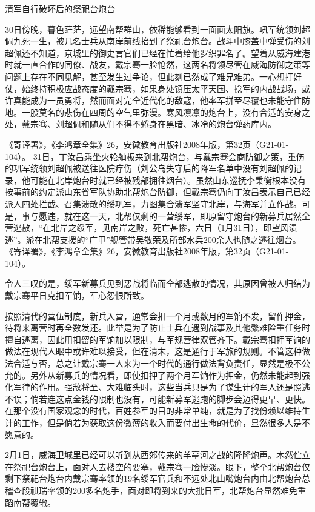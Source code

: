 \documentclass[12pt,UTF8]{ctexbook}
\begin{document}
清军自行破坏后的祭祀台炮台

30日傍晚，暮色茫茫，远望南帮群山，依稀能够看到一面面太阳旗。巩军统领刘超佩九死一生，被几名士兵从南岸前线抬到了祭祀台炮台。战斗中膝盖中弹受伤的刘超佩还不知道，京城里的御史言官们已经在忙着给他罗织罪名了。望着从威海建港时就一直合作的同僚、战友，戴宗骞一脸怆然，这两名将领尽管在威海防御之策等问题上存在不同见解，甚至发生过争论，但此刻已然成了难兄难弟。一心想打好仗，始终持积极应战态度的戴宗骞，如果身处镇压太平天国、捻军的内战战场，或许真能成为一员勇将，然而面对完全近代化的敌寇，他率军拼至尽覆也未能守住防地。一股莫名的悲伤在四周的空气里弥漫。寒风凛凛的炮台上，没有合适的安身之处，戴宗骞、刘超佩和随从们不得不蜷身在黑暗、冰冷的炮台弹药库内。

《寄译署》，《李鸿章全集》26，安徽教育出版社2008年版，第32页（G21-01-104）。
31日，丁汝昌乘坐火轮舢板来到北帮炮台，与戴宗骞会商防御之策，重伤的巩军统领刘超佩被送往医院疗伤（刘公岛失守后的降军名单中没有刘超佩的记录，他可能在北岸炮台时就已经被残部拥往烟台）。虽然山东巡抚李秉衡根本没有按事前的约定派山东省军队协助北帮炮台防御，但戴宗骞仍向丁汝昌表示自己已经派人四处拦截、召集溃散的绥巩军，力图集合溃军坚守北岸，与海军并立作战。可是，事与愿违，就在这一天，北帮仅剩的一营绥军，即原留守炮台的新募兵居然全营逃散，“在北岸之绥军，见南岸之败，死亡甚惨，六日（1月31日），即望风溃逃”。派在北帮支援的“广甲”舰管带吴敬荣及所部水兵200余人也随之逃往烟台。 《寄译署》，《李鸿章全集》26，安徽教育出版社2008年版，第32页（G21-01-104）。

令人三叹的是，绥军新募兵见到恶战将临而全部逃散的情况，其原因曾被人归结为戴宗骞平日克扣军饷，军心怨恨所致。

按照清代的营伍制度，新兵入营，通常会扣一个月或数月的军饷不发，留作押金，待将来离营时再全数发还。此举是为了防止士兵在遇到战事及其他繁难险重任务时擅自逃离，因此用扣留的军饷加以限制，与军规营律双管齐下。戴宗骞扣押军饷的做法在现代人眼中或许难以接受，但在清末，这是通行于军旅的规则。不管这种做法合适与否，总之让戴宗骞一人来为一个时代的通行做法背负责任，显然是极不公允的。另外从新募兵的情况看，即使扣押了两个月军饷作为押金，仍然未能起到强化军律的作用。强敌将至、大难临头时，这些当兵只是为了谋生计的军人还是照逃不误；倘若连这点金钱的限制也没有，可能新募军逃跑的脚步会迈得更早、更快。在那个没有国家观念的时代，百姓参军的目的非常单纯，就是为了找份赖以维持生计的工作，但是倘若为获取这份微薄的收入而要付出生命的代价，显然很多人是不愿意的。

2月1日，威海卫城里已经可以听到从西郊传来的羊亭河之战的隆隆炮声。木然伫立在祭祀台炮台上，面对人去楼空的要塞，戴宗骞一脸惨淡。眼下，整个北帮炮台仅剩下祭祀台炮台内戴宗骞率领的19名绥军官兵和不远处北山嘴炮台内由北帮炮台总稽查段祺瑞率领的200多名炮手，面对即将到来的大批日军，北帮炮台显然难免重蹈南帮覆辙。
\end{document}
